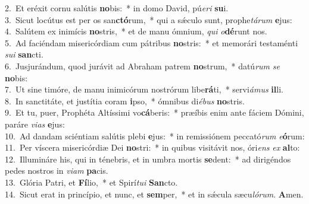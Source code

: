 {2.~}Et eréxit cornu salútis \textbf{no}bis:~* in domo David, pú\textit{e}\textit{ri} \textbf{su}i.\\
{3.~}Sicut locútus est per os san\textbf{ctó}rum,~* qui a sǽculo sunt, prophe\textit{tá}\textit{rum} \textbf{e}jus:\\
{4.~}Salútem ex inimícis \textbf{no}stris,~* et de manu ómnium, \textit{qui} \textit{o}\textbf{dé}runt nos.\\
{5.~}Ad faciéndam misericórdiam cum pátribus \textbf{no}stris:~* et memorári testaménti \textit{su}\textit{i} \textbf{san}cti.\\
{6.~}Jusjurándum, quod jurávit ad Abraham patrem \textbf{no}strum,~* datú\textit{rum} \textit{se} \textbf{no}bis:\\
{7.~}Ut sine timóre, de manu inimicórum nostrórum libe\textbf{rá}ti,~* servi\textit{á}\textit{mus} \textbf{il}li.\\
{8.~}In sanctitáte, et justítia coram \textbf{i}pso,~* ómnibus di\textit{é}\textit{bus} \textbf{no}stris.\\
{9.~}Et tu, puer, Prophéta Altíssimi vo\textbf{cá}beris:~* præíbis enim ante fáciem Dómini, paráre \textit{vi}\textit{as} \textbf{e}jus:\\
{10.~}Ad dandam sciéntiam salútis plebi \textbf{e}jus:~* in remissiónem peccató\textit{rum} \textit{e}\textbf{ó}rum:\\
{11.~}Per víscera misericórdiæ Dei \textbf{no}stri:~* in quibus visitávit nos, óri\textit{ens} \textit{ex} \textbf{al}to:\\
{12.~}Illumináre his, qui in ténebris, et in umbra mortis \textbf{se}dent:~* ad dirigéndos pedes nostros in \textit{vi}\textit{am} \textbf{pa}cis.\\
{13.~}Glória Patri, et \textbf{Fí}lio,~* et Spirí\textit{tu}\textit{i} \textbf{San}cto.\\
{14.~}Sicut erat in princípio, et nunc, et \textbf{sem}per,~* et in sǽcula sæcu\textit{ló}\textit{rum}. \textbf{A}men.\\
